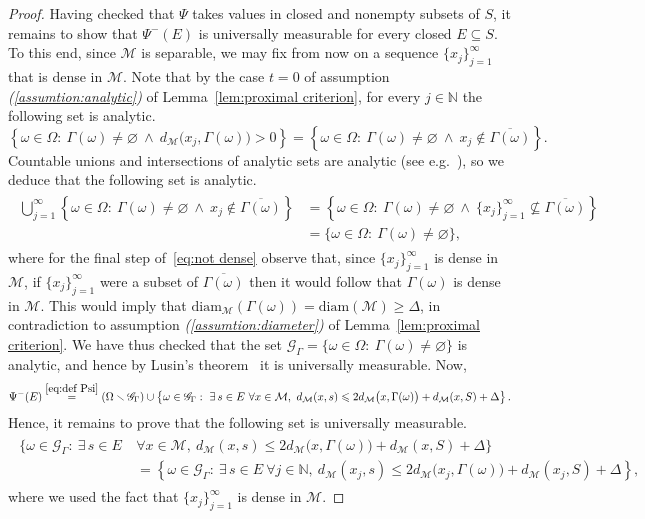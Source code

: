 \documentclass[11pt,reqno]{amsart}
\renewcommand{\le}{\leqslant}
\renewcommand{\ge}{\geqslant}
\renewcommand{\setminus}{\smallsetminus}
\newcommand{\diam}{\mathrm{diam}}
\theoremstyle{remark}
\newcommand{\MM}{\mathcal{M}}
\renewcommand{\subset}{\subseteq}
\newcommand{\N}{\mathbb N}
\renewcommand{\emptyset}{\varnothing}
\renewcommand{\1}{\mathbf 1}
\newcommand{\cG}{\mathscr{G}}
\begin{document}
\begin{proof}
Having checked that $\Psi$ takes values in closed and nonempty subsets of $S$, it remains to show that $\Psi^-(E)$ is universally measurable for every closed  $E\subset S$. To this end, since $\MM$ is separable, we may fix from now on a sequence $\{x_j\}_{j=1}^\infty$ that is dense in $\MM$. Note that by the case $t=0$ of assumption {\em (\ref{assumtion:analytic})} of Lemma~\ref{lem:proximal criterion}, for every $j\in \N$ the following set is analytic.
$$
\left\{\omega\in \Omega:\ \Gamma(\omega)\neq\emptyset\  \wedge\  d_\MM\big(x_j,\Gamma(\omega)\big)>0\right\}=\left\{\omega\in \Omega:\ \Gamma(\omega)\neq\emptyset\  \wedge\  x_j\notin \overline{\Gamma(\omega)}\right\}.
$$
Countable unions and intersections of analytic sets are analytic (see e.g.~\cite[Proposition~14.4]{Kec95}), so we deduce that the following set is analytic.
\begin{align}\label{eq:not dense}
\begin{split}
 \bigcup_{j=1}^\infty \left\{\omega\in \Omega:\ \Gamma(\omega)\neq\emptyset\  \wedge\  x_j\notin \overline{\Gamma(\omega)}\right\}&=\left\{\omega\in \Omega:\ \Gamma(\omega)\neq\emptyset\  \wedge\  \{x_j\}_{j=1}^\infty \not\subseteq \overline{\Gamma(\omega)}\right\}\\
&= \{\omega\in \Omega:\ \Gamma(\omega)\neq\emptyset\},
\end{split}
\end{align}
where for the final step of~\eqref{eq:not dense} observe that, since $\{x_j\}_{j=1}^\infty$ is dense in $\MM$, if $\{x_j\}_{j=1}^\infty$ were a subset of $\overline{\Gamma(\omega)}$ then it would follow that $\Gamma(\omega)$ is dense in $\MM$. This would imply that $\diam_\MM(\Gamma(\omega))=\diam(\MM)\ge \Delta$, in contradiction to assumption {\em (\ref{assumtion:diameter})} of Lemma~\ref{lem:proximal criterion}. We have thus checked that the set $\cG_\Gamma=\{\omega\in \Omega:\ \Gamma(\omega)\neq\emptyset\}$ is analytic, and hence by Lusin's theorem~\cite{Luz17,Lus72} it is universally measurable. Now,
\begin{align*}
\Psi^-(E) \stackrel{\eqref{eq:def Psi}}{=}(\Omega\setminus \cG_\Gamma) \cup\left\{\omega\in \cG_\Gamma:\ \exists\, s\in E\ \forall  x\in \MM,\ d_\MM(x,s)\le 2d_\MM\big(x,\Gamma(\omega)\big)+d_\MM(x,S)+\Delta\right\}.
\end{align*}
Hence, it remains to prove that the following set is universally measurable.
\begin{align}\label{eq:put x_j in}
\begin{split}
\big\{\omega\in \cG_\Gamma:\ \exists\, s\in E\ &\forall  x\in \MM,\ d_\MM(x,s)\le 2d_\MM\big(x,\Gamma(\omega)\big)+d_\MM(x,S)+\Delta\big\}\\
&=\left\{\omega\in \cG_\Gamma:\ \exists\, s\in E\ \forall  j\in \N,\ d_\MM(x_j,s)\le 2d_\MM\big(x_j,\Gamma(\omega)\big)+d_\MM(x_j,S)+\Delta\right\},
\end{split}
\end{align}
where we used the fact that $\{x_j\}_{j=1}^\infty$ is dense in $\MM$.


\end{proof}
\end{document}
